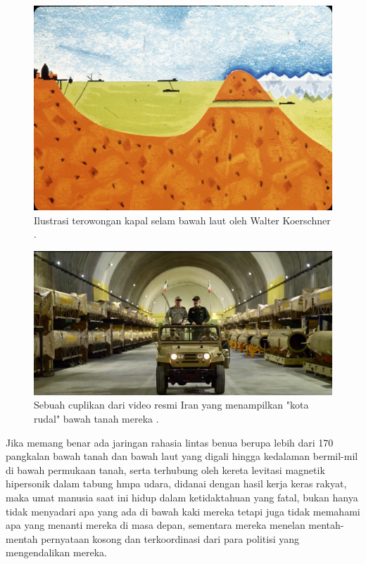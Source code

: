 \documentclass[10pt,twocolumn,letterpaper]{article}
\begin{document}
\begin{figure}[t]
\begin{center}
   \includegraphics[width=1\linewidth]{sub.jpg}
\end{center}
   \caption{Ilustrasi terowongan kapal selam bawah laut oleh Walter Koerschner \cite{22,23}.}
\label{fig:6}
\label{fig:onecol}

\end{figure}

\begin{figure}[t]
\begin{center}
   \includegraphics[width=1\linewidth]{iran.jpeg}
\end{center}
   \caption{Sebuah cuplikan dari video resmi Iran yang menampilkan "kota rudal" bawah tanah mereka \cite{39,40}.}
\label{fig:12}
\label{fig:onecol}
\end{figure}

Jika memang benar ada jaringan rahasia lintas benua berupa lebih dari 170 pangkalan bawah tanah dan bawah laut yang digali hingga kedalaman bermil-mil di bawah permukaan tanah, serta terhubung oleh kereta levitasi magnetik hipersonik dalam tabung hmpa udara, didanai dengan hasil kerja keras rakyat, maka umat manusia saat ini hidup dalam ketidaktahuan yang fatal, bukan hanya tidak menyadari apa yang ada di bawah kaki mereka tetapi juga tidak memahami apa yang menanti mereka di masa depan, sementara mereka menelan mentah-mentah pernyataan kosong dan terkoordinasi dari para politisi yang mengendalikan mereka.
\end{document}
